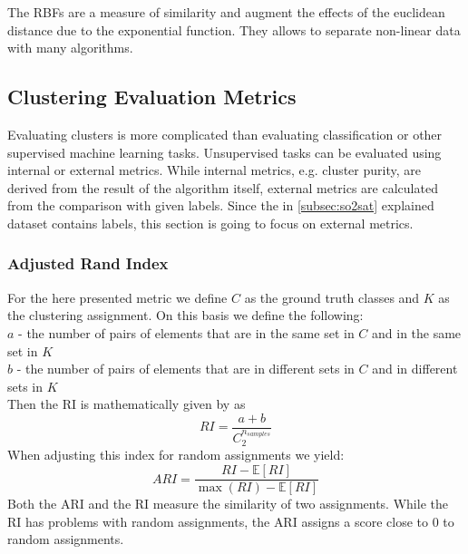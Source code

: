 The \glspl{RBF} are a measure of similarity and augment the effects of the euclidean distance due to the exponential function.
They allows to separate non-linear data with many algorithms.


\subsection{Clustering Evaluation Metrics}
\label{subsec:clustering_evaluation_metrics}

Evaluating clusters is more complicated than evaluating classification or other supervised machine learning tasks.
Unsupervised tasks can be evaluated using internal or external metrics.
While internal metrics, e.g. cluster purity, are derived from the result of the algorithm itself, external metrics are calculated from the comparison with given labels.
Since the in \cref{subsec:so2sat} explained dataset contains labels, this section is going to focus on external metrics.



\subsubsection{Adjusted Rand Index}
For the here presented metric we define \(C\) as the ground truth classes and \(K\) as the clustering assignment.
On this basis we define the following:\\
\(a\) - the number of pairs of elements that are in the same set in \(C\) and in the same set in \(K\)\\
\(b\) - the number of pairs of elements that are in different sets in \(C\) and in different sets in \(K\)\\
Then the \gls{RI} is mathematically given by \cite{noauthor_23_2020} as
\[RI = \frac{a + b}{C_2^{n_{samples}}}\]
When adjusting this index for random assignments we yield:
\[ARI = \frac{RI - \mathbb{E} [RI]}{\max (RI) - \mathbb{E} [RI]}\]
Both the \gls{ARI} and the \gls{RI} measure the similarity of two assignments.
While the \gls{RI} has problems with random assignments, the \gls{ARI} assigns a score close to \(0\)
to random assignments.


